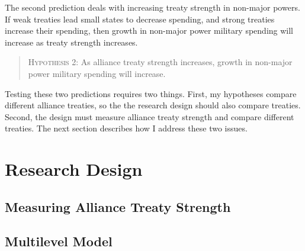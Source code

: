 \documentclass[12pt]{article}
\begin{document}
The second prediction deals with increasing treaty strength in non-major powers. 
If weak treaties lead small states to decrease spending, and strong treaties increase their spending, then growth in non-major power military spending will increase as treaty strength increases. 


\begin{quote}
\textsc{Hypothesis 2}: As alliance treaty strength increases, growth in non-major power military spending will increase. 
\end{quote}


Testing these two predictions requires two things. 
First, my hypotheses compare different alliance treaties, so the the research design should also compare treaties. 
Second, the design must measure alliance treaty strength and compare different treaties.  
The next section describes how I address these two issues. 


\section{Research Design} 




\subsection{Measuring Alliance Treaty Strength} 












\subsection{Multilevel Model} 





\end{document}
